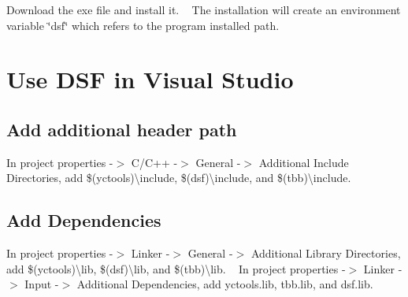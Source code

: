  Download the exe file and install it. ~\newline
 The installation will create an environment variable \char`\"{}dsf\char`\"{} which refers to the program installed path.\hypertarget{_win_use_win}{}\section{Use D\+S\+F in Visual Studio}\label{_win_use_win}
\hypertarget{_win_include_win}{}\subsection{Add additional header path}\label{_win_include_win}
In project properties -\/$>$ C/\+C++ -\/$>$ General -\/$>$ Additional Include Directories, add \$(yctools)\textbackslash{}include, \$(dsf)\textbackslash{}include, and \$(tbb)\textbackslash{}include.\hypertarget{_win_link_win}{}\subsection{Add Dependencies}\label{_win_link_win}
In project properties -\/$>$ Linker -\/$>$ General -\/$>$ Additional Library Directories, add \$(yctools)\textbackslash{}lib, \$(dsf)\textbackslash{}lib, and \$(tbb)\textbackslash{}lib. ~\newline
 In project properties -\/$>$ Linker -\/$>$ Input -\/$>$ Additional Dependencies, add yctools.\+lib, tbb.\+lib, and dsf.\+lib. 